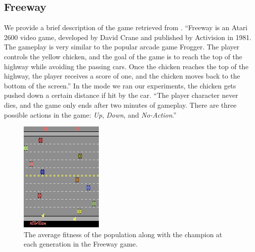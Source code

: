 \documentclass{acm_proc_article-sp}
\begin{document}
\subsection {Freeway}
We provide a brief description of the game retrieved from \cite{naddaf10}. ``Freeway is an Atari 2600 video game, developed by David Crane and published by Activision in 1981. The gameplay is very similar to the popular arcade game Frogger. The player controls the yellow chicken, and the goal of the game is to reach the top of the highway while avoiding the passing cars. Once the chicken reaches the top of the highway, the player receives a score of one, and the chicken moves back to the bottom of the screen.'' In the mode we ran our experiments, the chicken gets pushed down a certain distance if hit by the car. ``The player character never dies, and the game only ends after two minutes of gameplay. There are three possible actions in the game: \textit{Up}, \textit{Down}, and \textit{No-Action}.''

\begin{figure}[ht]
\begin{center}
\includegraphics[width=\columnwidth]{figures/freeway}
\end{center}
\caption{The average fitness of the population along with the champion at each generation in the Freeway game.}
\label{fig:freeway-curve}
\end{figure}
\end{document}
